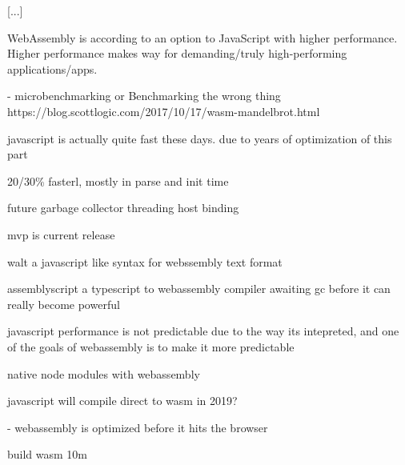 \parencite{LehmannPradel2018,MalleGiulianiKiesebergHolzinger2018}

[...]

WebAssembly is according to \textcite{HaasRossbergSchuffTitzerHolmanGohmanWagnerZakaiBastien2017} an option to JavaScript with higher performance. Higher performance makes way for demanding/truly high-performing applications/apps.


- microbenchmarking or Benchmarking the wrong thing
https://blog.scottlogic.com/2017/10/17/wasm-mandelbrot.html

javascript is actually quite fast these days. due to years of optimization of this part

20/30\% fasterl, mostly in parse and init time

future
garbage collector
threading 
host binding

mvp is current release

walt a javascript like syntax for webssembly text format

assemblyscript a typescript to webassembly compiler
 awaiting gc before it can really become powerful

javascript performance is not predictable due to the way its intepreted, and one of the goals of webassembly is to make it more predictable


native node modules with webassembly

javascript will compile direct to wasm in 2019?

- webassembly is optimized before it hits the browser


build wasm 10m
